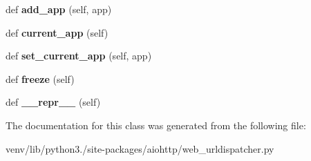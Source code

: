 \begin{DoxyCompactItemize}
def {\bfseries add\+\_\+app} (self, app)
\item 
\mbox{\label{classaiohttp_1_1web__urldispatcher_1_1_url_mapping_match_info_a69c8028a6a9491b86b4bfbe451a28bd5}} 
def {\bfseries current\+\_\+app} (self)
\item 
\mbox{\label{classaiohttp_1_1web__urldispatcher_1_1_url_mapping_match_info_abab8928856d9cb9e03e2cdbfe51f2677}} 
def {\bfseries set\+\_\+current\+\_\+app} (self, app)
\item 
\mbox{\label{classaiohttp_1_1web__urldispatcher_1_1_url_mapping_match_info_a7258a803da5057e24747b0b35a144f70}} 
def {\bfseries freeze} (self)
\item 
\mbox{\label{classaiohttp_1_1web__urldispatcher_1_1_url_mapping_match_info_a1646d6a2c285a604824d2d940ae8fc18}} 
def {\bfseries \+\_\+\+\_\+repr\+\_\+\+\_\+} (self)
\end{DoxyCompactItemize}


The documentation for this class was generated from the following file\+:\begin{DoxyCompactItemize}
\item 
venv/lib/python3./site-\/packages/aiohttp/web\+\_\+urldispatcher.\+py\end{DoxyCompactItemize}
